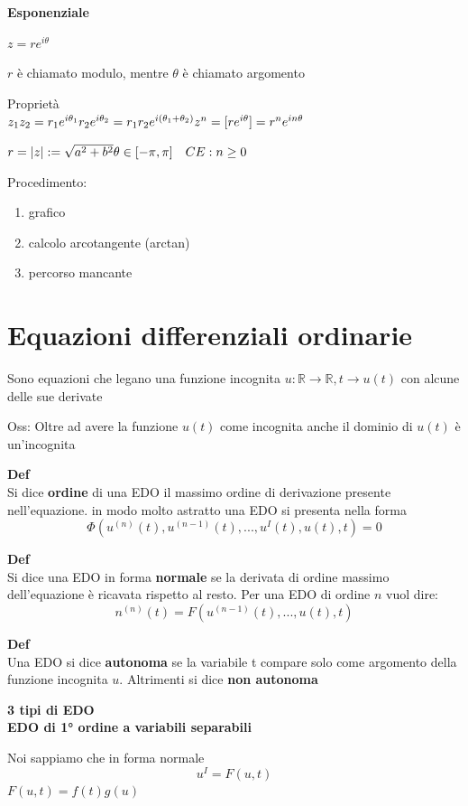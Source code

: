 \documentclass[12pt, a4paper]{article}
\begin{document}
\textbf{Esponenziale}
\begin{center}
    $z=re^{i\theta}$
\end{center}
$r$ è chiamato modulo, mentre $\theta$ è chiamato argomento

Proprietà\\$z_{1}z_{2}=r_{1}e^{i\theta_{1}}r_{2}e^{i\theta_{2}}=r_{1}r_{2}e^{i(\theta_{1}+\theta_{2})}\\
z^{n}=[re^{i\theta}]=r^{n}e^{in\theta}$

$r=|z|:=\sqrt{a^{2}+b^{2}}\\
\theta\in[-\pi,\pi]\quad CE:n\geq 0$

Procedimento:
\begin{enumerate}
    \item grafico
    \item calcolo arcotangente (arctan)
    \item percorso mancante
\end{enumerate}

\newpage
\section{Equazioni differenziali ordinarie}
Sono equazioni che legano una funzione incognita $u:\mathbb{R}\to\mathbb{R}, t\to u(t)$ con alcune delle sue
derivate

Oss: Oltre ad avere la funzione $u(t)$ come incognita anche il dominio di $u(t)$ è un'incognita

\textbf{Def}\\Si dice \textbf{ordine} di una EDO il massimo ordine di derivazione presente nell'equazione.
in modo molto astratto una EDO si presenta nella forma
\[\Phi(u^{(n)}(t),u^{(n-1)}(t),...,u^{I}(t),u(t),t)=0\]

\textbf{Def}\\Si dice una EDO in forma \textbf{normale} se la derivata di ordine massimo dell'equazione è ricavata
rispetto al resto. Per una EDO di ordine $n$ vuol dire:\[n^{(n)}(t)=F(u^{(n-1)}(t),...,u(t),t)\]

\textbf{Def}\\Una EDO si dice \textbf{autonoma} se la variabile t compare solo come argomento della funzione
incognita $u$. Altrimenti si dice \textbf{non autonoma}

\textbf{3 tipi di EDO\\EDO di 1° ordine a variabili separabili}

Noi sappiamo che in forma normale \[u^{I}=F(u,t)\]
$F(u,t)=f(t)g(u)$
\end{document}
